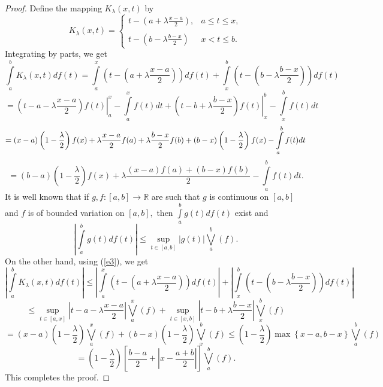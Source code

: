 \documentclass[
11pt,%
tightenlines,%
twoside,%
onecolumn,%
nofloats,%
nobibnotes,%
nofootinbib,%
superscriptaddress,%
noshowpacs,%
centertags]%
{revtex4}
\begin{document}
\begin{proof}
Define the mapping $K_{\lambda }(x,t)$ by%
\begin{equation*}
K_{\lambda }(x,t)=\left\{
\begin{array}{cc}
t-\left( a+\lambda \frac{x-a}{2}\right) , & a\leq t\leq x, \\
&  \\
t-\left( b-\lambda \frac{b-x}{2}\right) & x<t\leq b.%
\end{array}%
\right.
\end{equation*}%
Integrating by parts, we get%
$$
\int\limits_{a}^{b}K_{\lambda }(x,t)df(t)  \label{e2}  =
\int\limits_{a}^{x}\left( t-\left( a+\lambda \frac{x-a}{2}\right)
\right) df(t)+\int\limits_{x}^{b}\left( t-\left( b-\lambda \frac{b-x}{2}%
\right) \right) df(t)
$$
$$
 = \left. \left( t-a-\lambda \frac{x-a}{2}\right) f(t)\right\vert
_{a}^{x}-\int\limits_{a}^{x}f(t)dt  +\left. \left( t-b+\lambda
\frac{b-x}{2}\right) f(t)\right\vert
_{x}^{b}-\int\limits_{x}^{b}f(t)dt
$$
$$
 = \left( x-a\right) \left( 1-\frac{\lambda }{2}\right) f(x)+\lambda \frac{%
x-a}{2}f(a)  +\lambda \frac{b-x}{2}f(b)+\left( b-x\right) \left( 1-\frac{\lambda }{2}%
\right) f(x)-\int\limits_{a}^{b}f(t)dt
$$
$$
 = \left( b-a\right) \left( 1-\frac{\lambda }{2}\right) f\left(
x\right)
+\lambda \frac{\left( x-a\right) f(a)+\left( b-x\right) f(b)}{2}%
-\int\limits_{a}^{b}f(t)dt.
$$
It is well known that if $g,f:\left[
a,b\right] \rightarrow
\mathbb{R}
$ are such that $g$ is continuous on $\left[ a,b\right] $ and $f$ is of
bounded variation on $\left[ a,b\right] ,$ then $\int%
\limits_{a}^{b}g(t)df(t)$ exist and
\begin{equation}
\left\vert \int\limits_{a}^{b}g(t)df(t)\right\vert \leq \sup_{t\in \left[
a,b\right] }\left\vert g(t)\right\vert \bigvee\limits_{a}^{b}(f).
\label{e3}
\end{equation}%
On the other hand, using (\ref{e3}), we get%
$$
\left\vert \int\limits_{a}^{b}K_{\lambda }(x,t)df(t)\right\vert
\leq \left\vert \int\limits_{a}^{x}\left( t-\left( a+\lambda \frac{x-a}{2}%
\right) \right) df(t)\right\vert +\left\vert \int\limits_{x}^{b}\left(
t-\left( b-\lambda \frac{b-x}{2}\right) \right) df(t)\right\vert
$$
$$
\leq \sup_{t\in \left[ a,x\right] }\left\vert t-a-\lambda \frac{x-a}{2}%
\right\vert \bigvee\limits_{a}^{x}(f)+\sup_{t\in \left[ x,b\right]
}\left\vert t-b+\lambda \frac{b-x}{2}\right\vert \bigvee\limits_{x}^{b}(f)
$$
$$
 = \left( x-a\right) \left( 1-\frac{\lambda }{2}\right)
\bigvee\limits_{a}^{x}(f)+\left( b-x\right) \left( 1-\frac{\lambda }{2}%
\right) \bigvee\limits_{x}^{b}(f) \leq \left( 1-\frac{\lambda
}{2}\right) \max \left\{ x-a,b-x\right\} \bigvee\limits_{a}^{b}(f)
$$
$$
 = \left( 1-\frac{\lambda }{2}\right) \left[ \frac{b-a}{2}+\left\vert x-%
\frac{a+b}{2}\right\vert \right] \bigvee\limits_{a}^{b}(f).
$$
This completes the proof.
\end{proof}
\end{document}

